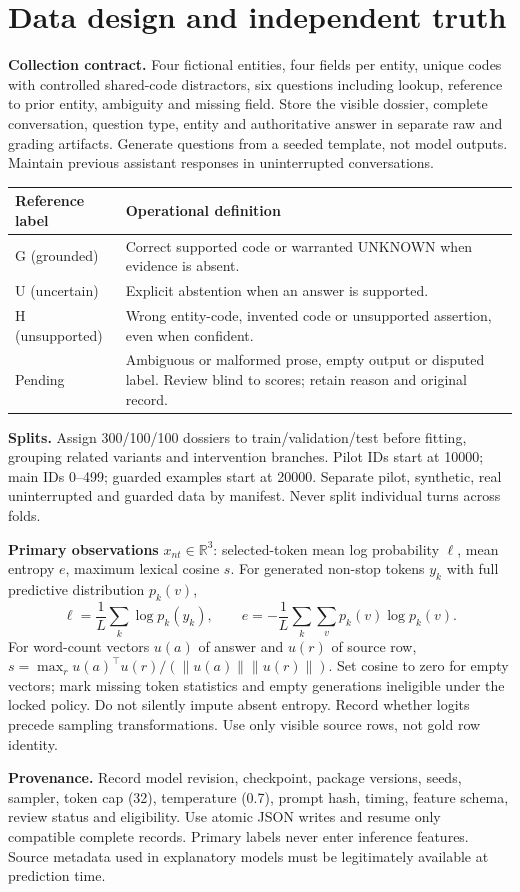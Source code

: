 \documentclass[11pt,letterpaper]{article}
\newcommand{\R}{\mathbb R}
\newcommand{\sectionpage}[1]{\clearpage\section{#1}}
\begin{document}
\sectionpage{Data design and independent truth}
\textbf{Collection contract.} Four fictional entities, four fields per entity, unique codes with controlled shared-code distractors, six questions including lookup, reference to prior entity, ambiguity and missing field. Store the visible dossier, complete conversation, question type, entity and authoritative answer in separate raw and grading artifacts. Generate questions from a seeded template, not model outputs. Maintain previous assistant responses in uninterrupted conversations.


\begin{tabularx}{\linewidth}{p{.17\linewidth}X}
\toprule Reference label & Operational definition \\ \midrule
G (grounded) & Correct supported code or warranted UNKNOWN when evidence is absent. \\
U (uncertain) & Explicit abstention when an answer is supported. \\
H (unsupported) & Wrong entity-code, invented code or unsupported assertion, even when confident. \\
Pending & Ambiguous or malformed prose, empty output or disputed label. Review blind to scores; retain reason and original record. \\ \bottomrule
\end{tabularx}

\textbf{Splits.} Assign 300/100/100 dossiers to train/validation/test before fitting, grouping related variants and intervention branches. Pilot IDs start at 10000; main IDs 0--499; guarded examples start at 20000. Separate pilot, synthetic, real uninterrupted and guarded data by manifest. Never split individual turns across folds.

\textbf{Primary observations} $x_{nt}\in\R^3$: selected-token mean log probability $\ell$, mean entropy $e$, maximum lexical cosine $s$. For generated non-stop tokens $y_k$ with full predictive distribution $p_k(v)$,
\[
\ell=\frac1L\sum_k\log p_k(y_k),\qquad
e=-\frac1L\sum_k\sum_v p_k(v)\log p_k(v).
\]
For word-count vectors $u(a)$ of answer and $u(r)$ of source row, $s=\max_r u(a)^\top u(r)/(\|u(a)\|\|u(r)\|)$. Set cosine to zero for empty vectors; mark missing token statistics and empty generations ineligible under the locked policy. Do not silently impute absent entropy. Record whether logits precede sampling transformations. Use only visible source rows, not gold row identity.

\textbf{Provenance.} Record model revision, checkpoint, package versions, seeds, sampler, token cap (32), temperature (0.7), prompt hash, timing, feature schema, review status and eligibility. Use atomic JSON writes and resume only compatible complete records. Primary labels never enter inference features. Source metadata used in explanatory models must be legitimately available at prediction time.
\end{document}
